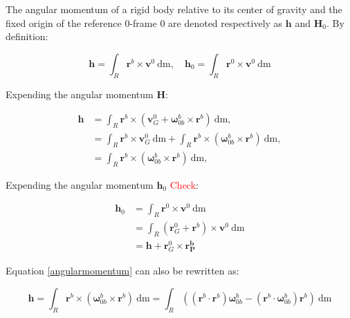 \documentclass{article}
\begin{document}
The angular momentum of a rigid body relative to its center of gravity and the fixed origin of the reference 0-frame $0$ are denoted respectively as $\textbf{h}$ and $\textbf{H}_0$. By definition:



\begin{equation}
\textbf{h}= \int_{R} \textbf{r}^b \times \textbf{v}^0 \:  \text{dm},
\quad
\textbf{h}_0= \int_{R} \textbf{r}^0 \times \textbf{v}^0\: \text{dm}
\end{equation}


Expending the angular momentum $\textbf{H}$:

\begin{align}\label{angularmomentum}
\textbf{h} &= \int_{R} \textbf{r}^b \times (\textbf{v}_G^0  +   \mathbf{\omega}_{0b}^b \times \textbf{r}^b) \:  \text{dm}, \\
    & = \int_{R} \textbf{r}^b \times \textbf{v}_G^0  \:  \text{dm}   +  \int_{R}  \textbf{r}^b \times  (\mathbf{\omega}_{0b}^b \times \textbf{r}^b) \:  \text{dm}, \\
  & =  \int_{R}  \textbf{r}^b \times  (\mathbf{\omega}_{0b}^b \times \textbf{r}^b) \:  \text{dm}, 
\end{align}


Expending the angular momentum $\textbf{h}_0$ \textcolor{red}{Check}:

\begin{align}
\textbf{h}_0 & = \int_{R} \textbf{r}^0 \times \textbf{v}^0\: \text{dm} \\
 & = \int_{R} (\textbf{r}_G^0 + \textbf{r}^b)  \times \textbf{v}^0\: \text{dm} \\
& =  \textbf{h} +   \textbf{r}_G^0  \times \mathbf{r^b_P}
\end{align}


 Equation \ref{angularmomentum} can also be rewritten as: 

\begin{equation} \label{angularmomentumFinal}
\textbf{h}=  \int_{R} \textbf{r}^b \times (\mathbf{\omega}_{0b}^b \times \textbf{r}^b) \: \text{dm} =  \int_{R} ((\textbf{r}^b\cdot \textbf{r}^b) \mathbf{\omega}_{0b}^b - (\textbf{r}^b\cdot \mathbf{\omega}_{0b}^b)\textbf{r}^b) \: \text{dm}
\end{equation}
\end{document}
